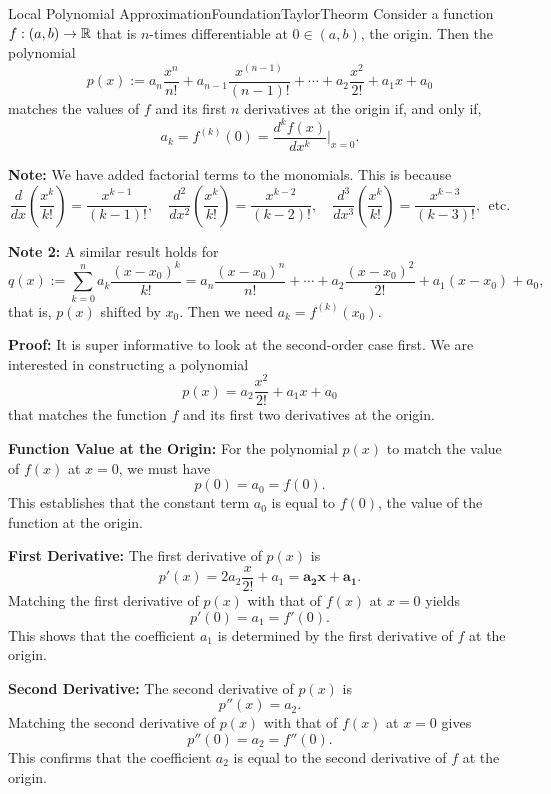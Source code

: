  \begin{propColor}{Local Polynomial Approximation}{FoundationTaylorTheorm} Consider a function\( f:(a, b) \to \mathbb R \) that is $n$-times differentiable at $0 \in (a, b)$, the origin. Then the polynomial
\begin{equation}
    p(x):=a_n \frac{x^n}{n!} + a_{n-1} \frac{x^{(n-1)}}{(n-1)!} +\cdots + a_2 \frac{x^2}{2!} + a_1 x + a_0 
\end{equation}
matches the values of $f$ and its first $n$ derivatives at the origin if, and only if, 
\begin{equation}
    a_k = f^{(k)}(0) =\frac{d^k f(x)}{dx^k} \Big|_{x=0}.
\end{equation}

\bigskip

\textbf{Note:} We have added factorial terms to the monomials. This is because 
  $$ \frac{d}{dx} \left( \frac{x^k}{k !} \right) = \frac{x^{k-1}}{(k-1) !}, \quad \frac{d^2}{dx^2} \left( \frac{x^k}{k !} \right) = \frac{x^{k-2}}{(k-2) !},\quad \frac{d^3}{dx^3} \left(\frac{x^k}{k !}  \right)=\frac{x^{k-3}}{(k-3) !}, ~~\text{etc}.$$ 

  \bigskip

\textbf{Note 2:} A similar result holds for 
$$q(x):= \sum_{k=0}^n a_k\frac{(x-x_0)^k}{k !} = a_n \frac{(x-x_0)^n}{n!} + \cdots + a_2 \frac{(x-x_0)^2}{2!} + a_1 (x-x_0) + a_0, $$
that is, $p(x)$ shifted by $x_0$. Then we need $a_k = f^{(k)}(x_0)$.
     
 \end{propColor}
 \textbf{Proof:} It is super informative to look at the second-order case first. We are interested in constructing a polynomial
\[
p(x) = a_2 \frac{x^2}{2!} + a_1 x + a_0
\]
that matches the function \(f\) and its first two derivatives at the origin.

\textbf{Function Value at the Origin:} For the polynomial \(p(x)\) to match the value of \(f(x)\) at \(x=0\), we must have
\[
p(0) = a_0 = f(0).
\]
This establishes that the constant term \(a_0\) is equal to \(f(0)\), the value of the function at the origin.

\textbf{First Derivative:} The first derivative of \(p(x)\) is
\[
p'(x) = 2a_2 \frac{x}{2!} + a_1 = \bm{a_2 x + a_1}.
\]
Matching the first derivative of \(p(x)\) with that of \(f(x)\) at \(x=0\) yields
\[
p'(0) = a_1 = f'(0).
\]
This shows that the coefficient \(a_1\) is determined by the first derivative of \(f\) at the origin.

\textbf{Second Derivative:} The second derivative of \(p(x)\) is
\[
p''(x) = a_2.
\]
Matching the second derivative of \(p(x)\) with that of \(f(x)\) at \(x=0\) gives
\[
p''(0) = a_2 = f''(0).
\]
This confirms that the coefficient \(a_2\) is equal to the second derivative of \(f\) at the origin. \\

